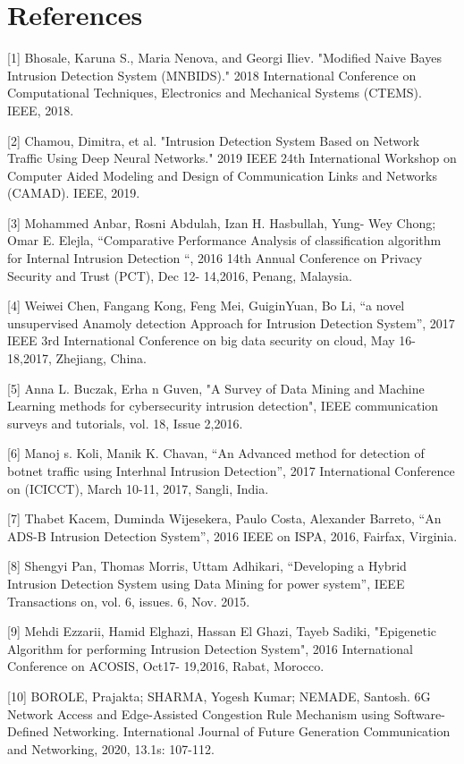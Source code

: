 \documentclass[conference]{IEEEtran}
\begin{document}
\section*{References}

[1]	Bhosale, Karuna S., Maria Nenova, and Georgi Iliev. "Modified Naive Bayes Intrusion Detection System (MNBIDS)." 2018 International Conference on Computational Techniques, Electronics and Mechanical Systems (CTEMS). IEEE, 2018.

[2]	Chamou, Dimitra, et al. "Intrusion Detection System Based on Network Traffic Using Deep Neural Networks." 2019 IEEE 24th International Workshop on Computer Aided Modeling and Design of Communication Links and Networks (CAMAD). IEEE, 2019.

[3]	Mohammed Anbar, Rosni Abdulah, Izan H. Hasbullah, Yung- Wey Chong; Omar E. Elejla, “Comparative Performance Analysis of classification algorithm for Internal Intrusion Detection “, 2016 14th Annual Conference on Privacy Security and Trust (PCT), Dec 12- 14,2016, Penang, Malaysia.

[4]	Weiwei Chen, Fangang Kong, Feng Mei, GuiginYuan, Bo Li, “a novel unsupervised Anamoly detection Approach for Intrusion Detection System”, 2017 IEEE 3rd International Conference on big data security on cloud, May 16-18,2017, Zhejiang, China.

[5]	Anna L. Buczak, Erha n Guven, "A Survey of Data Mining and Machine Learning methods for cybersecurity intrusion detection", IEEE communication surveys and tutorials, vol. 18, Issue 2,2016.

[6]	Manoj s. Koli, Manik K. Chavan, “An Advanced method for detection of botnet traffic using Interhnal Intrusion Detection”, 2017 International Conference on (ICICCT), March 10-11, 2017, Sangli, India.

[7]	Thabet Kacem, Duminda Wijesekera, Paulo Costa, Alexander Barreto, “An ADS-B Intrusion Detection System”, 2016 IEEE on ISPA, 2016, Fairfax, Virginia.

[8]	Shengyi Pan, Thomas Morris, Uttam Adhikari, “Developing a Hybrid Intrusion Detection System using Data Mining for power system”, IEEE Transactions on, vol. 6, issues. 6, Nov. 2015.

[9]	Mehdi Ezzarii, Hamid Elghazi, Hassan El Ghazi, Tayeb Sadiki, "Epigenetic Algorithm for performing Intrusion Detection System", 2016 International Conference on ACOSIS, Oct17- 19,2016, Rabat, Morocco.

[10]	BOROLE, Prajakta; SHARMA, Yogesh Kumar; NEMADE, Santosh. 6G Network Access and Edge-Assisted Congestion Rule Mechanism using Software-Defined Networking. International Journal of Future Generation Communication and Networking, 2020, 13.1s: 107-112.
\end{document}
